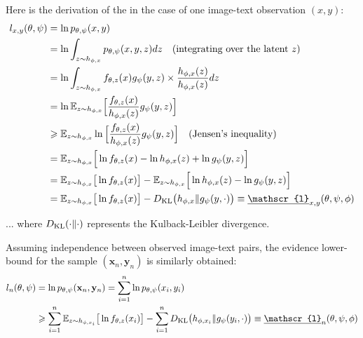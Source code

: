 \documentclass{article}
\begin{document}
\begin{appendix}
Here is the derivation of the  in the case of one image-text observation $(x,y)$:
\begin{align*}
l_{x,y}(\theta,\psi)&=\ln p_{\theta,\psi}(x,y)\\
&=\ln \int_{z \sim h_{\phi,x}} p_{\theta,\psi}(x,y,z) dz  \quad \text{(integrating over the latent $z$)} \\
&=\ln \int_{z \sim h_{\phi,x}} f_{\theta,z}(x)g_\psi(y,z)\times\frac{h_{\phi,x}(z)}{h_{\phi,x}(z)} dz \\
&=\ln \mathbb{E}_{z \sim h_{\phi,x}} \Big[ \frac{f_{\theta,z}(x)}{h_{\phi,x}(z)}g_\psi(y,z)  \Big]\\
&\geqslant  \mathbb{E}_{z \sim h_{\phi,x}} \ln \Big[ \frac{f_{\theta,z}(x)}{h_{\phi,x}(z)}g_\psi(y,z)  \Big] \quad \text{(Jensen's inequality)} \\
& = \mathbb{E}_{z \sim h_{\phi,x}} \Big[ \ln f_{\theta,z}(x) - \ln h_{\phi,x}(z) + \ln g_\psi(y,z)  \Big] \\
& = \mathbb{E}_{z \sim h_{\phi,x}} \big[ \ln f_{\theta,z}(x) \big]- \mathbb{E}_{z \sim h_{\phi,x}}\Big[\ln h_{\phi,x}(z) - \ln g_\psi(y,z)  \Big] \\
& = \mathbb{E}_{z \sim h_{\phi,x}} \big[ \ln f_{\theta,z}(x) \big]-\KL \big(h_{\phi,x} \| g_\psi(y,\cdot) \big) \equiv \underline{\mathscr{l}}_{x,y}(\theta,\psi,\phi)
\end{align*}

... where $D_{\mathrm{KL}}(\cdot\|\cdot)$ represents the Kulback-Leibler divergence.

Assuming independence between observed image-text pairs, the evidence lower-bound for the sample $(\mathbf{x}_n,\mathbf{y}_n)$ is similarly obtained:
\begin{align*}
l_n(\theta,\psi)&=\ln p_{\theta,\psi}(\mathbf{x}_n,\mathbf{y}_n)=\sum_{i=1}^n \ln p_{\theta,\psi}(x_i,y_i)\\
&\geqslant \sum_{i=1}^n \mathbb{E}_{z \sim h_{\phi,x_i}} \big[ \ln f_{\theta,z}(x_i) \big]-\sum_{i=1}^n \KL \big(h_{\phi,x_i} \| g_\psi(y_i,\cdot) \big) \equiv \underline{\mathscr{l}}_n(\theta,\psi,\phi)
\end{align*}

\clearpage

\begin{multicols}{2}



\end{multicols}
\end{appendix}
\end{document}
